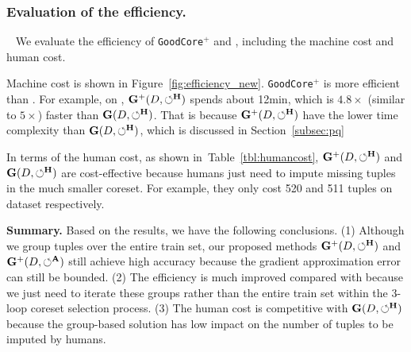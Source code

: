 \subsubsection{Evaluation of the efficiency.}~\label{sec:exp:efficiency_g} We  evaluate the efficiency of \texttt{GoodCore}$^+$ and \ours, including the machine cost and human cost.

 Machine cost is shown  in Figure~\ref{fig:efficiency_new}.  \texttt{GoodCore}$^+$ is more efficient than \ours. For example, on \imdbl, $\mathbf{G}^+(D,\circlearrowleft^\mathbf{H})$ spends about 12min, which is $4.8\times$ (similar to $5\times$) faster than $\mathbf{G}(D,\circlearrowleft^\mathbf{H})$. That is because $\mathbf{G}^+(D,\circlearrowleft^\mathbf{H})$ have the lower time complexity than $\mathbf{G}(D,\circlearrowleft^\mathbf{H})$, which is discussed in Section~\ref{subsec:pq}


 In terms of the human cost, as shown in~Table~\ref{tbl:humancost}, $\mathbf{G}^+(D,\circlearrowleft^\mathbf{H})$ and $\mathbf{G}(D,\circlearrowleft^\mathbf{H})$ are cost-effective because humans just need to impute missing tuples in the much smaller coreset. For example, they only cost 520 and 511 tuples on dataset \imdbl respectively. 

\noindent \textbf{Summary.} 
Based on the results, we have the following conclusions. (1) Although we group tuples over the entire train set, our proposed methods $\mathbf{G}^+(D,\circlearrowleft^\mathbf{H})$ and $\mathbf{G}^+(D,\circlearrowleft^\mathbf{A})$ still achieve high  accuracy because the gradient approximation error can still be bounded. (2) The efficiency is much improved compared with \ours because we just need to iterate these groups rather than  the entire train set within the 3-loop coreset selection process. (3) The human cost is competitive with $\mathbf{G}(D,\circlearrowleft^\mathbf{H})$ because the group-based solution has low impact on the number of tuples to be imputed by humans.


